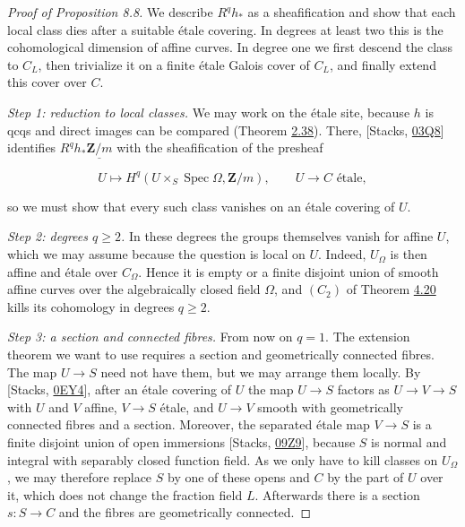 \documentclass[11pt]{article}
\begin{document}
\begin{proof}[{Proof of Proposition 8.8}]\label{bp670}%
We describe \(R^qh_*\) as a sheafification and show that each local class dies after a suitable étale covering. In degrees at least two this is the cohomological dimension of affine curves. In degree one we first descend the class to \(C_L\), then trivialize it on a finite étale Galois cover of \(C_L\), and finally extend this cover over \(C\).

\emph{Step 1: reduction to local classes.} We may work on the étale site, because \(h\) is qcqs and direct images can be compared (Theorem \hyperref[bp113]{2.38}). There, [Stacks, \href{https://stacks.math.columbia.edu/tag/03Q8}{03Q8}] identifies \(R^qh_*\underline{\mathbf Z/m}\) with the sheafification of the presheaf

\[
U\longmapsto H^q(U\times_S\operatorname{Spec}\Omega,
\mathbf Z/m),
\qquad U\to C\text{ \'etale},
\]

so we must show that every such class vanishes on an étale covering of \(U\).

\emph{Step 2: degrees \(q\geq2\).} In these degrees the groups themselves vanish for affine \(U\), which we may assume because the question is local on \(U\). Indeed, \(U_\Omega\) is then affine and étale over \(C_\Omega\). Hence it is empty or a finite disjoint union of smooth affine curves over the algebraically closed field \(\Omega\), and \((C_2)\) of Theorem \hyperref[bp340]{4.20} kills its cohomology in degrees \(q\geq2\).

\emph{Step 3: a section and connected fibres.} From now on \(q=1\). The extension theorem we want to use requires a section and geometrically connected fibres. The map \(U\to S\) need not have them, but we may arrange them locally. By [Stacks, \href{https://stacks.math.columbia.edu/tag/0EY4}{0EY4}], after an étale covering of \(U\) the map \(U\to S\) factors as \(U\to V\to S\) with \(U\) and \(V\) affine, \(V\to S\) étale, and \(U\to V\) smooth with geometrically connected fibres and a section. Moreover, the separated étale map \(V\to S\) is a finite disjoint union of open immersions [Stacks, \href{https://stacks.math.columbia.edu/tag/09Z9}{09Z9}], because \(S\) is normal and integral with separably closed function field. As we only have to kill classes on \(U_\Omega\), we may therefore replace \(S\) by one of these opens and \(C\) by the part of \(U\) over it, which does not change the fraction field \(L\). Afterwards there is a section \(s:S\to C\) and the fibres are geometrically connected.


\end{proof}
\end{document}
